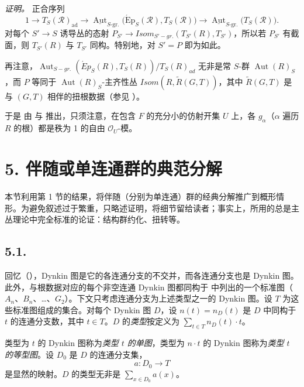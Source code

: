 \emph{证明。} 正合序列
\[
  1\longrightarrow T_S(\mathscr R)_{\mathrm{ad}}
  \longrightarrow
  \underline{\operatorname{Aut}}_{S\text{-}\mathrm{gr.}}
  \bigl(\operatorname{\acute{E}p}_S(\mathscr R),T_S(\mathscr R)\bigr)
  \longrightarrow
  \underline{\operatorname{Aut}}_{S\text{-}\mathrm{gr.}}\bigl(T_S(\mathscr R)\bigr).
\]
对每个 \(S' \to S\) 诱导丛的态射 \(P_{S'} \to Isom_{S'-gr.}(T_{S'}(R), T_{S'})\)，所以若 \(P_{S'}\) 有截面，则 \(T_{S'}(R)\) 与 \(T_{S'}\) 同构。特别地，对 \(S' = P\) 即为如此。

再注意，\(\operatorname{Aut}_{S-gr.}(\acute{E}p_{S}(R), T_{S}(R)) / T_{S}(R)_{ad}\) 无非是常 \(S\)-群 \(\operatorname{Aut}(R)_{S}\)，而 \(P\) 等同于 \(\operatorname{Aut}(R)_{S}\)-主齐性丛 \(Isom(R, \tilde{R}(G, T))\)，其中 \(\tilde{R}(G, T)\) 是与 \((G, T)\) 相伴的扭根数据（参见 ）。

于是  由  与  推出，只须注意，在包含 \(F\) 的充分小的仿射开集 \(U\) 上，各 \(g_{\alpha}\)（\(\alpha\) 遍历 \(R\) 的根）都是秩为 1 的自由 \(\mathcal O_U\)-模。

\section*{5. 伴随或单连通群的典范分解}
本节利用第 1 节的结果，将伴随（分别为单连通）群的经典分解推广到概形情形。为避免叙述过于繁重，只略述证明，将细节留给读者；事实上，所用的总是主丛理论中完全标准的论证：结构群约化、扭转等。

\subsection*{5.1.}
回忆（），Dynkin 图是它的各连通分支的不交并，而各连通分支也是 Dynkin 图。此外，与根数据对应的每个非空连通 Dynkin 图都同构于 中列出的一个标准图（\(A_{n}\)、\(B_{n}\)、\ldots、\(G_2\)）。下文只考虑连通分支为上述类型之一的 Dynkin 图。设 \(T\) 为这些标准图组成的集合。对每个 Dynkin 图 \(D\)，设 \(n(t) = n_{D}(t)\) 是 \(D\) 中同构于 \(t\) 的连通分支数，其中 \(t \in T\)。\(D\) 的\emph{类型}按定义为 \(\sum_{t \in T} n_{D}(t) \cdot t\)。

类型为 \(t\) 的 Dynkin 图称为\emph{类型 \(t\) 的单图}，类型为 \(n \cdot t\) 的 Dynkin 图称为\emph{类型 \(t\) 的等型图}。设 \(D_0\) 是 \(D\) 的连通分支集，
\[ a : D_{0} \to T \]
是显然的映射。\(D\) 的类型无非是 \(\sum_{x \in D_{0}} a(x)\)。


